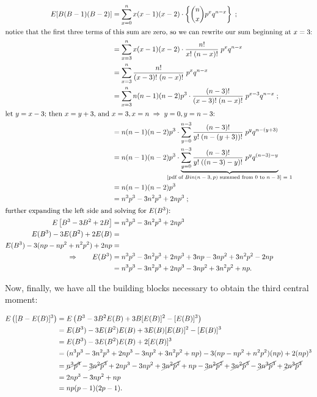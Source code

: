 \documentclass{article}
\begin{document}
\begin{align*}
  E[B(B-1)(B-2)] &= \sum_{x=0}^n x (x-1) (x-2) \cdot \left\{ \binom{n}{x} p^x q^{n-x} \right\} \;; \\
  \intertext{notice that the first three terms of this sum are zero, so we can rewrite our sum beginning at $x = 3$:}
  &= \sum_{x=3}^n x(x-1)(x-2) \cdot \frac{n!}{x!\;(n-x)!} \; p^x q^{n-x} \\
  &= \sum_{x=3}^n \frac{n!}{(x-3)!\;(n-x)!} \; p^x q^{n-x} \\
  &= \sum_{x=3}^n n(n-1)(n-2) p^3 \cdot \frac{(n-3)!}{(x-3)!\;(n-x)!} \; p^{x-3}q^{n-x} \;; \\
  \intertext{let $y=x-3$; then $x=y+3$, and $x=3, x=n \Ra y=0, y=n-3$:}
  &= n(n-1)(n-2)p^3 \cdot \sum_{y=0}^{n-3} \frac{(n-3)!}{y!\;(n-(y+3))!} \; p^y q^{n-(y+3)} \\
  &= n(n-1)(n-2)p^3 \cdot \underbrace {\sum_{y=0}^{n-3} \frac{(n-3)!}{y!\;((n-3)-y)!} \; p^y q^{(n-3)-y}}_{\mathclap{\textnormal{[pdf of $Bin(n-3,p)$ summed from 0 to $n-3$] = 1}}} \\
  &= n(n-1)(n-2)p^3 \\
  &= n^3p^3 - 3n^2p^3 + 2np^3 \;; \\
  \intertext{further expanding the left side and solving for $E(B^3)$:}
  E \left[ B^3 - 3B^2 + 2B \right] &= n^3p^3 - 3n^2p^3 + 2np^3 \\
  E(B^3) - 3E(B^2) + 2E(B) &= \\
  E(B^3) - 3(np - np^2 + n^2p^2) + 2np &= \\
  \Rightarrow \qquad E(B^3) &= n^3p^3 - 3n^2p^3 + 2np^3 + 3np - 3np^2 + 3n^2p^2 - 2np \\
  &= n^3p^3 - 3n^2p^3 + 2np^3 - 3np^2 + 3n^2p^2 + np.
\end{align*}

Now, finally, we have all the building blocks necessary to obtain the third
central moment:

\begin{align*}
  E \left( [B - E(B)]^3 \right) &= E \left( B^3 - 3B^2 E(B) + 3B [E(B)]^2 - [E(B)]^3 \right) \\
  &= E(B^3) - 3 E(B^2) E(B) + 3 E(B) [E(B)]^2 - [E(B)]^3 \\
  &= E(B^3) - 3 E(B^2) E(B) + 2 [E(B)]^3 \\
  &= (n^3p^3 - 3n^2p^3 + 2np^3 - 3np^2 + 3n^2p^2 + np) - 3(np - np^2 + n^2p^2)(np) + 2(np)^3 \\
  &= \cancel{n^3p^3} - \cancel{3n^2p^3} + 2np^3 - 3np^2 + \cancel{3n^2p^2} + np - \cancel{3n^2p^2} + \cancel{3n^2p^3} - \cancel{3n^3p^3} + \cancel{2n^3p^3} \\
  &= 2np^3 - 3np^2 + np \\
  &= np(p-1)(2p-1).
\end{align*}
\end{document}
